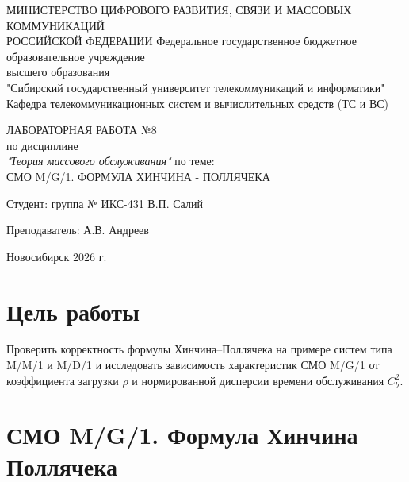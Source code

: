 \documentclass[a4paper,14pt,oneside,openany]{memoir}
\begin{document}
\thispagestyle{empty}
\begin{center}
    МИНИСТЕРСТВО ЦИФРОВОГО РАЗВИТИЯ, СВЯЗИ И МАССОВЫХ КОММУНИКАЦИЙ \\ РОССИЙСКОЙ ФЕДЕРАЦИИ
    \vspace{20pt}
    Федеральное государственное бюджетное образовательное учреждение \\ высшего образования \\
    "Сибирский государственный университет телекоммуникаций и информатики" \\
    \vspace{20pt}
    Кафедра телекоммуникационных систем и вычислительных средств (ТС и ВС)
\end{center}
\vfill
\begin{center}
    ЛАБОРАТОРНАЯ РАБОТА №8 \\
    по дисциплине \\
    \textit{"Теория массового обслуживания"}
    \vspace{20pt}
    по теме: \\
    \uppercase{СМО M/G/1. Формула Хинчина - Поллячека}
\end{center}
\vfill
\noindent Студент: группа № ИКС-431 \hfill В.П. Салий

\vspace{20pt}

\noindent Преподаватель: \hfill А.В. Андреев
\vfill
\begin{center}
    Новосибирск 2026 г.
\end{center}

\newpage
\setcounter{page}{2}
\OnehalfSpacing*

\chapter*{Цель работы}
Проверить корректность формулы Хинчина--Поллячека на примере систем типа M/M/1 и M/D/1 и исследовать зависимость характеристик СМО M/G/1 от коэффициента загрузки $\rho$ и нормированной дисперсии времени обслуживания $C_b^2$.

\chapter{СМО M/G/1. Формула Хинчина--Поллячека}
\label{ch:lab8}
\end{document}
